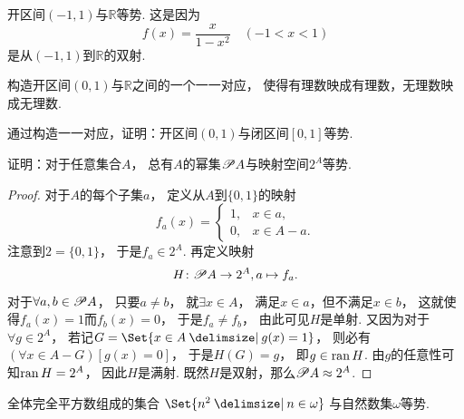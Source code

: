 \begin{example}\label{example:基数.开区间与全体实数等势2}
开区间\((-1,1)\)与\(\mathbb{R}\)等势.
这是因为\begin{equation*}
	f(x) = \frac{x}{1-x^2}
	\quad(-1<x<1)
\end{equation*}是从\((-1,1)\)到\(\mathbb{R}\)的双射.
\end{example}

\begin{example}
构造开区间\((0,1)\)与\(\mathbb{R}\)之间的一个一一对应，
使得有理数映成有理数，无理数映成无理数.
\end{example}

\begin{example}
通过构造一一对应，证明：开区间\((0,1)\)与闭区间\([0,1]\)等势.
\end{example}

\begin{example}\label{example:基数.幂集与特征函数空间等势}
证明：对于任意集合\(A\)，
总有\(A\)的幂集\(\mathscr{P} A\)与映射空间\(2^A\)等势.
\begin{proof}
对于\(A\)的每个子集\(a\)，
定义从\(A\)到\(\{0,1\}\)的映射\begin{equation*}
	f_a(x) = \left\{ \begin{array}{cl}
		1, & x \in a, \\
		0, & x \in A - a.
	\end{array} \right.
\end{equation*}
注意到\(2=\{0,1\}\)，
于是\(f_a \in 2^A\).
再定义映射\begin{equation*}
	H\colon \mathscr{P} A \to 2^A,
	a \mapsto f_a.
\end{equation*}
对于\(\forall a,b \in \mathscr{P} A\)，
只要\(a \neq b\)，
就\(\exists x \in A\)，
满足\(x \in a\)，但不满足\(x \in b\)，
这就使得\(f_a(x) = 1\)而\(f_b(x) = 0\)，
于是\(f_a \neq f_b\)，
由此可见\(H\)是单射.
又因为对于\(\forall g \in 2^A\)，
若记\(G = \Set{ x \in A \given g(x) = 1 }\)，
则必有\((\forall x \in A - G)[g(x) = 0]\)，
于是\(H(G) = g\)，
即\(g \in \operatorname{ran} H\).
由\(g\)的任意性可知\(\operatorname{ran} H = 2^A\)，
因此\(H\)是满射.
既然\(H\)是双射，那么\(\mathscr{P} A \approx 2^A\).
\end{proof}
\end{example}

\begin{example}
全体完全平方数组成的集合
\(
	\Set{
		n^2
		\given
		n \in \omega
	}
\)
与自然数集\(\omega\)等势.
\end{example}

